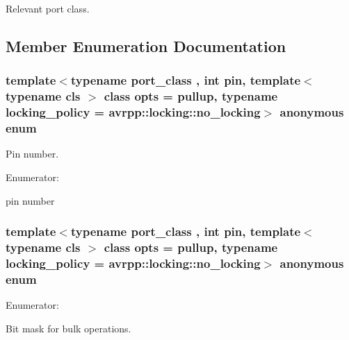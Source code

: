 Relevant port class. 



\subsection{Member Enumeration Documentation}
\hypertarget{structavrpp_1_1ports_1_1input_a0ec963047937dfde79ebe298aa0369aa}{
\subsubsection[{"@23}]{\setlength{\rightskip}{0pt plus 5cm}template$<$typename port\_\-class , int pin, template$<$ typename cls $>$ class opts = pullup, typename locking\_\-policy  = avrpp::locking::no\_\-locking$>$ anonymous enum}}
\label{structavrpp_1_1ports_1_1input_a0ec963047937dfde79ebe298aa0369aa}


Pin number. 

\begin{Desc}
\item[Enumerator: ]\par
\begin{description}
\item[{\em 
\hypertarget{structavrpp_1_1ports_1_1input_a0ec963047937dfde79ebe298aa0369aaa901102f476429ff0127f921c66bdd8f0}{
port\_\-pin}
\label{structavrpp_1_1ports_1_1input_a0ec963047937dfde79ebe298aa0369aaa901102f476429ff0127f921c66bdd8f0}
}]pin number \end{description}
\end{Desc}

\hypertarget{structavrpp_1_1ports_1_1input_af2c9daae83b210070499e9cfcc8d119e}{
\subsubsection[{"@24}]{\setlength{\rightskip}{0pt plus 5cm}template$<$typename port\_\-class , int pin, template$<$ typename cls $>$ class opts = pullup, typename locking\_\-policy  = avrpp::locking::no\_\-locking$>$ anonymous enum}}
\label{structavrpp_1_1ports_1_1input_af2c9daae83b210070499e9cfcc8d119e}
\begin{Desc}
\item[Enumerator: ]\par
\begin{description}
\item[{\em 
\hypertarget{structavrpp_1_1ports_1_1input_af2c9daae83b210070499e9cfcc8d119ea9f3c3682f9f46b5e25b657f502f32e58}{
bulk\_\-mask}
\label{structavrpp_1_1ports_1_1input_af2c9daae83b210070499e9cfcc8d119ea9f3c3682f9f46b5e25b657f502f32e58}
}]Bit mask for bulk operations. \end{description}
\end{Desc}



